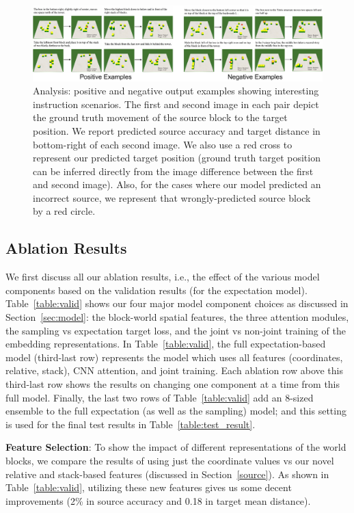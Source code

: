 \documentclass[letterpaper]{article} %
\begin{document}
\begin{figure}[ht!]
\centering
\includegraphics[width=0.99\linewidth]{wide_pdf.pdf}
\caption{Analysis: positive and negative output examples showing interesting instruction scenarios. The first and second image in each pair depict the ground truth movement of the source block to the target position. We report predicted source accuracy and target distance in bottom-right of each second image. We also use a red cross to represent our predicted target position (ground truth target position can be inferred directly from the image difference between the first and second image). Also, for the cases where our model predicted an incorrect source, we represent that wrongly-predicted source block by a red circle.
}
\label{fig:examples}
\end{figure}

\subsection{Ablation Results}
\label{sec:val}
We first discuss all our ablation results, i.e., the effect of the various model components based on the validation results (for the expectation model). Table~\ref{table:valid} shows our four major model component choices as discussed in Section~\ref{sec:model}: the block-world spatial features, the three attention modules, the sampling vs expectation target loss, and the joint vs non-joint training of the embedding representations.  In Table~\ref{table:valid}, the full expectation-based model (third-last row) represents the model which uses all features (coordinates, relative, stack), CNN attention, and joint training. Each ablation row above this third-last row shows the results on changing one component at a time from this full model. Finally, the last two rows of Table~\ref{table:valid} add an 8-sized ensemble to the full expectation (as well as the sampling) model; and this setting is used for the final test results in Table~\ref{table:test_result}.

\textbf{Feature Selection}:
To show the impact of different representations of the world blocks, we compare the results of using just the coordinate values vs our novel relative and stack-based features (discussed in Section~\ref{source}).
As shown in Table~\ref{table:valid}, utilizing these new features gives us some decent improvements (2\% in source accuracy and 0.18 in target mean distance).
\end{document}
